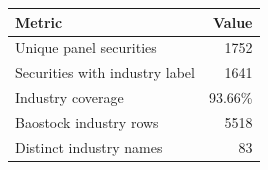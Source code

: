 \begin{tabular}{lr}
\toprule
Metric & Value \\
\midrule
Unique panel securities & 1752 \\
Securities with industry label & 1641 \\
Industry coverage & 93.66\% \\
Baostock industry rows & 5518 \\
Distinct industry names & 83 \\
\bottomrule
\end{tabular}

